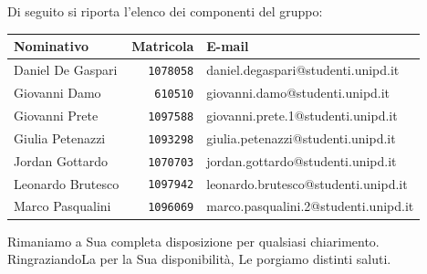 \documentclass[a4paper,12pt]{letteracdp}
\begin{document}
\begin{letter}
    \noindent Di seguito si riporta l'elenco dei componenti del gruppo:
    \vspace{0.8cm}
	\begin{center}
		\begin{tabular}{lrl}
			\toprule
			\textbf{Nominativo} & \textbf{Matricola} & \textbf{E-mail} \\
			\midrule
			Daniel De Gaspari 	& \texttt{1078058}	& daniel.degaspari@studenti.unipd.it\\
			Giovanni Damo		& \texttt{610510}	& giovanni.damo@studenti.unipd.it\\
			Giovanni Prete		& \texttt{1097588}	& giovanni.prete.1@studenti.unipd.it \\
			Giulia	Petenazzi	& \texttt{1093298}	& giulia.petenazzi@studenti.unipd.it \\
			Jordan Gottardo		& \texttt{1070703}	& jordan.gottardo@studenti.unipd.it \\
			Leonardo Brutesco	& \texttt{1097942}	& leonardo.brutesco@studenti.unipd.it\\
			Marco Pasqualini	& \texttt{1096069}	&  marco.pasqualini.2@studenti.unipd.it \\
		    \bottomrule
		\end{tabular}
	\end{center}
    \vspace{0.8cm}
	\noindent Rimaniamo a Sua completa disposizione per qualsiasi chiarimento.\\
	RingraziandoLa per la Sua disponibilità, Le porgiamo distinti saluti.
    \closing{\mbox{}}

	\end{letter}
\end{document}
